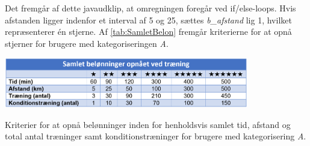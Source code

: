 \noindent
Det fremgår af dette javaudklip, at omregningen foregår ved if/else-loops. Hvis afstanden ligger indenfor et interval af 5 og 25, sættes \textit{b\_afstand} lig 1, hvilket repræsenterer én stjerne. Af \autoref{tab:SamletBelon} fremgår kriterierne for at opnå stjerner for brugere med kategoriseringen \textit{A}.  

\begin{table}[H]
\centering
\includegraphics[width=0.8\textwidth]{figures/imple/SamletBelon}
\caption{Kriterier for at opnå belønninger inden for henholdsvis samlet tid, afstand og total antal træninger samt konditionstræninger for brugere med kategorisering \textit{A}.}
\label{tab:SamletBelon}
\end{table}  
